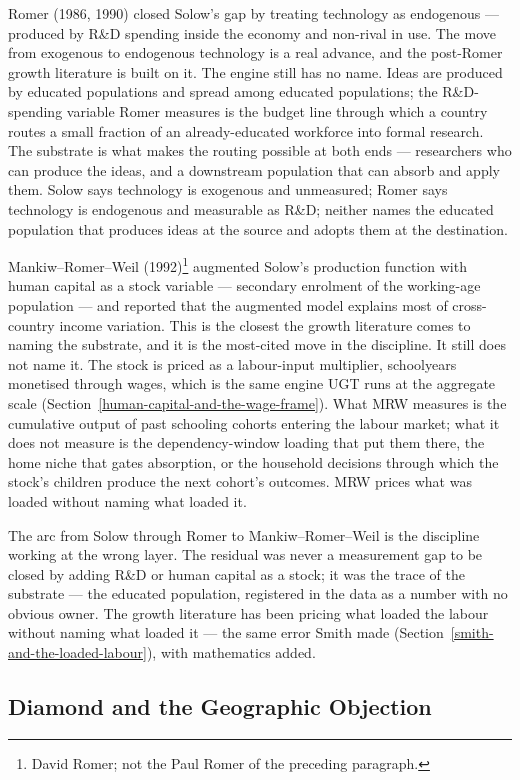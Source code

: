 \documentclass[12pt,letterpaper]{article}
\begin{document}
Romer (1986, 1990) closed Solow's gap by treating technology as endogenous --- produced by R\&D spending inside the economy and non-rival in use. The move from exogenous to endogenous technology is a real advance, and the post-Romer growth literature is built on it. The engine still has no name. Ideas are produced by educated populations and spread among educated populations; the R\&D-spending variable Romer measures is the budget line through which a country routes a small fraction of an already-educated workforce into formal research. The substrate is what makes the routing possible at both ends --- researchers who can produce the ideas, and a downstream population that can absorb and apply them. Solow says technology is exogenous and unmeasured; Romer says technology is endogenous and measurable as R\&D; neither names the educated population that produces ideas at the source and adopts them at the destination.

Mankiw--Romer--Weil (1992)\footnote{David Romer; not the Paul Romer of the preceding paragraph.} augmented Solow's production function with human capital as a stock variable --- secondary enrolment of the working-age population --- and reported that the augmented model explains most of cross-country income variation. This is the closest the growth literature comes to naming the substrate, and it is the most-cited move in the discipline. It still does not name it. The stock is priced as a labour-input multiplier, schoolyears monetised through wages, which is the same engine UGT runs at the aggregate scale (Section~\ref{human-capital-and-the-wage-frame}). What MRW measures is the cumulative output of past schooling cohorts entering the labour market; what it does not measure is the dependency-window loading that put them there, the home niche that gates absorption, or the household decisions through which the stock's children produce the next cohort's outcomes. MRW prices what was loaded without naming what loaded it.

The arc from Solow through Romer to Mankiw--Romer--Weil is the discipline working at the wrong layer. The residual was never a measurement gap to be closed by adding R\&D or human capital as a stock; it was the trace of the substrate --- the educated population, registered in the data as a number with no obvious owner. The growth literature has been pricing what loaded the labour without naming what loaded it --- the same error Smith made (Section~\ref{smith-and-the-loaded-labour}), with mathematics added.

\subsection{Diamond and the Geographic Objection}\label{diamond-geographic-objection}
\end{document}
